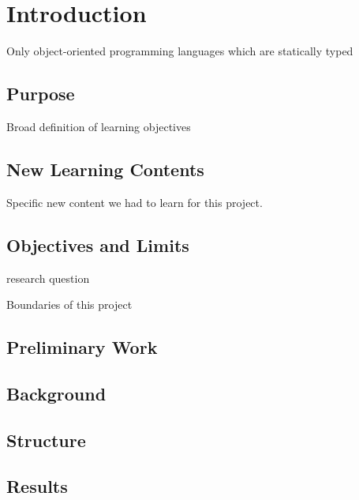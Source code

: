 \chapter{Introduction}
Only object-oriented programming languages which are statically typed

\section{Purpose}
Broad definition of learning objectives

\section{New Learning Contents}
Specific new content we had to learn for this project.

\section{Objectives and Limits}
research question

Boundaries of this project

\section{Preliminary Work}

\section{Background}

\section{Structure}

\section{Results}
